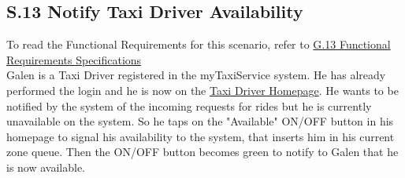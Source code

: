 		\subsection{S.13 Notify Taxi Driver Availability}\label{sec:TaxiDriverAvailabilityScenario}
		To read the Functional Requirements for this scenario, refer to \hyperref[sec:frs13]{G.13 Functional Requirements Specifications}\\

		Galen is a Taxi Driver registered in the myTaxiService system. He has already performed the login and he is now on the \hyperref[thomePage_m]{Taxi Driver Homepage}. He wants to be notified by the system of the incoming requests for rides but he is currently unavailable on the system. So he taps on the "Available" ON/OFF button in his homepage to signal his availability to the system, that inserts him in his current zone queue. Then the ON/OFF button becomes green to notify to Galen that he is now available.
